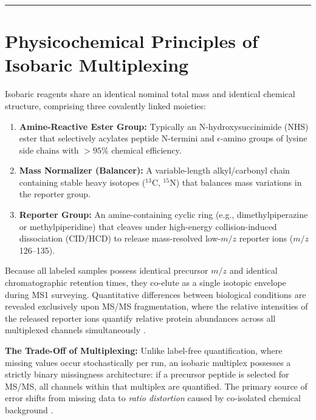 \documentclass[11pt,oneside]{book}
\begin{document}
\vspace{1em}
\noindent\rule{\textwidth}{0.8pt}

\section{Physicochemical Principles of Isobaric Multiplexing}

Isobaric reagents share an identical nominal total mass and identical chemical structure, comprising three covalently linked moieties:
\begin{enumerate}
    \item \textbf{Amine-Reactive Ester Group:} Typically an N-hydroxysuccinimide (NHS) ester that selectively acylates peptide N-termini and $\epsilon$-amino groups of lysine side chains with $>95\%$ chemical efficiency.
    \item \textbf{Mass Normalizer (Balancer):} A variable-length alkyl/carbonyl chain containing stable heavy isotopes ($^{13}\text{C}$, $^{15}\text{N}$) that balances mass variations in the reporter group.
    \item \textbf{Reporter Group:} An amine-containing cyclic ring (e.g., dimethylpiperazine or methylpiperidine) that cleaves under high-energy collision-induced dissociation (CID/HCD) to release mass-resolved low-$m/z$ reporter ions ($m/z$ 126--135).
\end{enumerate}

Because all labeled samples possess identical precursor $m/z$ and identical chromatographic retention times, they co-elute as a single isotopic envelope during MS1 surveying. Quantitative differences between biological conditions are revealed exclusively upon MS/MS fragmentation, where the relative intensities of the released reporter ions quantify relative protein abundances across all multiplexed channels simultaneously \cite{thompson2003tandem}.

\begin{notebox}
\textbf{The Trade-Off of Multiplexing:} Unlike label-free quantification, where missing values occur stochastically per run, an isobaric multiplex possesses a strictly binary missingness architecture: if a precursor peptide is selected for MS/MS, all channels within that multiplex are quantified. The primary source of error shifts from missing data to \textit{ratio distortion} caused by co-isolated chemical background \cite{ting2011sps}.
\end{notebox}
\end{document}
